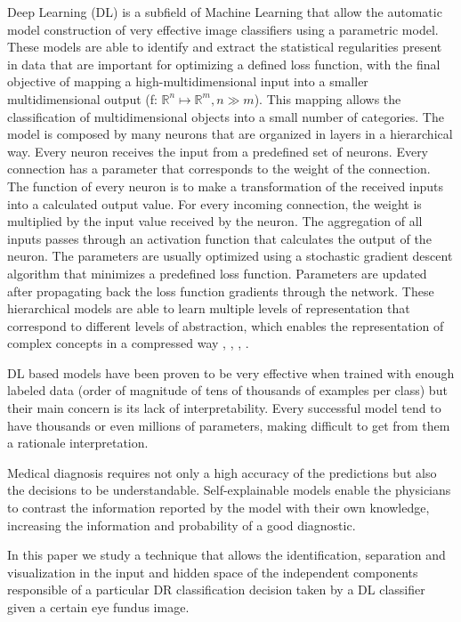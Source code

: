 \documentclass{llncs}
\begin{document}
Deep Learning (DL) is a subfield of Machine Learning that allow the automatic model construction of very effective image classifiers using a parametric model. These models are able to identify and extract the statistical regularities present in data that are important for optimizing a defined loss function, with the final objective of mapping a high-multidimensional input into a smaller multidimensional output (f: $\mathbb{R}^{n} \mapsto \mathbb{R}^{m}, n \gg m$). This mapping allows the classification of multidimensional objects into a small number of categories. The model is composed by many neurons that are organized in layers in a hierarchical way. Every neuron receives the input from a predefined set of neurons. Every connection has a parameter that corresponds to the weight of the connection. The function of every neuron is to make a transformation of the received inputs into a calculated output value. For every incoming connection, the weight is multiplied by the input value received by the neuron. The aggregation of all inputs passes through an activation function that calculates the output of the neuron. The parameters are usually optimized using a stochastic gradient descent algorithm that minimizes a predefined loss function. Parameters are updated after propagating back the loss function gradients through the network. These hierarchical models are able to learn multiple levels of representation that correspond to different levels of abstraction, which enables the representation of complex concepts in a compressed way \cite{nature-deep-learning}, \cite{888}, \cite{Bengio:2013:RLR:2498740.2498889}, \cite{bengio-2009}.

DL based models have been proven to be very effective when trained with enough labeled data (order of magnitude of tens of thousands of examples per class) but their main concern is its lack of interpretability. Every successful model tend to have thousands or even millions of parameters, making difficult to get from them a rationale interpretation. 

Medical diagnosis requires not only a high accuracy of the predictions but also the decisions to be understandable. Self-explainable models enable the physicians to contrast the information reported by the model with their own knowledge, increasing the information and probability of a good diagnostic.  

In this paper we study a technique that allows the identification, separation and visualization in the input and hidden space of the independent components responsible of a particular DR classification decision taken by a DL classifier given a certain eye fundus image. 
\end{document}
